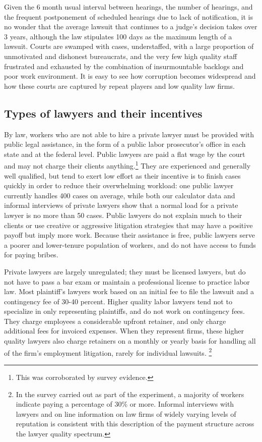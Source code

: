 \documentclass[11pt]{article}
\begin{document}
Given the 6 month usual interval between hearings, the number of hearings, and the frequent postponement of scheduled hearings due to lack of notification, it is no wonder that the average lawsuit that continues to a judge's decision takes over 3 years, although the law stipulates 100 days as the maximum length of a lawsuit. Courts are swamped with cases, understaffed, with a large proportion of unmotivated and dishonest bureaucrats, and the very few high quality staff frustrated and exhausted by the combination of insurmountable backlogs and poor work environment. It is easy to see how corruption becomes widespread and how these courts are captured by repeat players and low quality law firms.

\subsection{Types of lawyers and their incentives}

By law, workers who are not able to hire a private lawyer must be provided with public legal assistance, in the form of a public labor prosecutor's office in each state and at the federal level. Public lawyers are paid a flat wage by the court and may not charge their clients anything.\footnote{This was corroborated by survey evidence.} They are experienced and generally well qualified, but tend to exert low effort as their incentive is to finish cases quickly in order to reduce their overwhelming workload: one public lawyer currently handles 400 cases on average, while both our calculator data and informal interviews of private lawyers show that a normal load for a private lawyer is no more than 50 cases. Public lawyers do not explain much to their clients or use creative or aggressive litigation strategies that may have a positive payoff but imply more work. Because their assistance is free, public lawyers serve a poorer and lower-tenure population of workers, and do not have access to funds for paying bribes. 

Private lawyers are largely unregulated; they must be licensed lawyers, but do not have to pass a bar exam or maintain a professional license to practice labor law. Most plaintiff's lawyers work based on an initial fee to file the lawsuit and a contingency fee of 30-40 percent. Higher quality labor lawyers tend not to specialize in only representing plaintiffs, and do not work on contingency fees. They charge employees a considerable upfront retainer, and only charge additional fees for invoiced expenses. When they represent firms, these higher quality lawyers also charge retainers on a monthly or yearly basis for handling all of the firm's employment litigation, rarely for individual lawsuits. \footnote{In the survey carried out as part of the experiment, a majority of workers indicate paying a percentage of 30\% or more. Informal interviews with lawyers and on line information on law firms of widely varying levels of reputation is consistent with this description of the payment structure across the lawyer quality spectrum.}  
\end{document}
